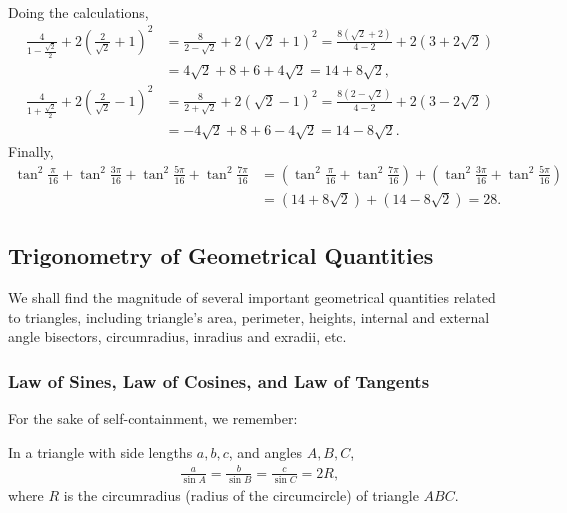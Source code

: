\documentclass[12pt,a4paper]{memoir}
\theoremstyle{definition}
\begin{document}
\begin{solution}[name=Solution by Amir Parvardi]
\begin{align*}
	\end{align*}
	Doing the calculations,
	\begin{align*}
		\frac{4}{1 - \frac{\sqrt 2}{2}} + 2 \left(\frac{2}{\sqrt 2} + 1\right)^2 &= \frac{8}{2 - \sqrt 2} + 2(\sqrt 2 + 1)^2 = \frac{8(\sqrt 2+ 2)}{4 - 2} + 2(3 + 2\sqrt 2)\\
		&= 4\sqrt 2 + 8 + 6 + 4 \sqrt 2 = 14 + 8\sqrt 2,\\
		\frac{4}{1 + \frac{\sqrt 2}{2}} + 2 \left(\frac{2}{\sqrt 2} - 1\right)^2 &= \frac{8}{2 + \sqrt 2} + 2(\sqrt 2 - 1)^2 = \frac{8(2 - \sqrt 2)}{4 - 2} + 2(3 - 2\sqrt 2)\\
		&= -4\sqrt 2 + 8 + 6 - 4 \sqrt 2 = 14 - 8\sqrt 2.
	\end{align*}
	Finally,
	\begin{align*}
		\tan^2\frac{\pi}{16}+ \tan^2\frac{3\pi}{16}+\tan^2\frac{5\pi}{16} + \tan^2\frac{7\pi}{16} &= \left(\tan^2\frac{\pi}{16}+\tan^2\frac{7\pi}{16}\right) + \left(\tan^2\frac{3\pi}{16} + \tan^2\frac{5\pi}{16}\right)\\
		&= (14 + 8 \sqrt 2) + (14 - 8 \sqrt 2) = 28.
	\end{align*}
\end{solution}


\newpage
\subsection{Trigonometry of Geometrical Quantities}

We shall find the magnitude of several important geometrical quantities related to triangles, including triangle's area, perimeter, heights, internal and external angle bisectors, circumradius, inradius and exradii, etc.

\subsubsection{Law of Sines, Law of Cosines, and Law of Tangents}
For the sake of self-containment, we remember:

	\begin{question}[name=Law of Sines]
		In a triangle with side lengths $a,b,c$, and angles $A,B,C$,
		\begin{align*}
			\frac{a}{\sin A} = \frac{b}{\sin B} = \frac{c}{\sin C} = 2R,
		\end{align*}
		where $R$ is the circumradius (radius of the circumcircle) of triangle $ABC$.
	\end{question}
\end{document}
